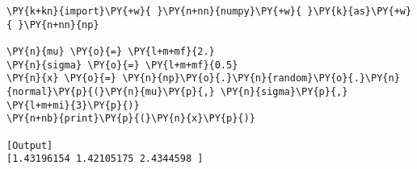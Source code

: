 \begin{Verbatim}[label=\makebox{\href{https://github.com/unipi-physics-labs/statnotes/tree/main/snippy/np.random.normal.py}{https://github.com/.../np.random.normal.py}},commandchars=\\\{\}]
\PY{k+kn}{import}\PY{+w}{ }\PY{n+nn}{numpy}\PY{+w}{ }\PY{k}{as}\PY{+w}{ }\PY{n+nn}{np}

\PY{n}{mu} \PY{o}{=} \PY{l+m+mf}{2.}
\PY{n}{sigma} \PY{o}{=} \PY{l+m+mf}{0.5}
\PY{n}{x} \PY{o}{=} \PY{n}{np}\PY{o}{.}\PY{n}{random}\PY{o}{.}\PY{n}{normal}\PY{p}{(}\PY{n}{mu}\PY{p}{,} \PY{n}{sigma}\PY{p}{,} \PY{l+m+mi}{3}\PY{p}{)}
\PY{n+nb}{print}\PY{p}{(}\PY{n}{x}\PY{p}{)}

[Output]
[1.43196154 1.42105175 2.4344598 ]
\end{Verbatim}
